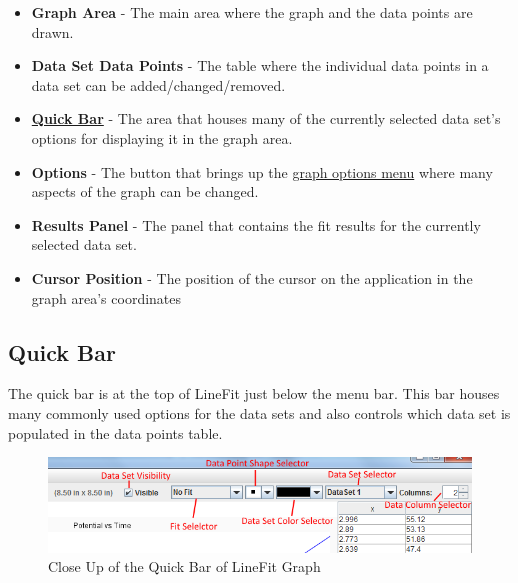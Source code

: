 \documentclass[titlepage,12pt]{article}
\begin{document}
\begin{itemize}
\item \textbf{Graph Area} - The main area where the graph and the data points are drawn.
\item \textbf{Data Set Data Points} - The table where the individual data points in a data set can be added/changed/removed.
\item \hyperref[sec:quickbar]{\textbf{Quick Bar}} - The area that houses many of the currently selected data set's options for displaying it in the graph area.
\item \textbf{Options} - The button that brings up the \hyperref[sec:options]{graph options menu} where many aspects of the graph can be changed.
\item \textbf{Results Panel} - The panel that contains the fit results for the currently selected data set.
\item \textbf{Cursor Position} - The position of the cursor on the application in the graph area's coordinates
\end{itemize}



\subsection{Quick Bar}
\label{sec:quickbar}

The quick bar is at the top of LineFit just below the menu bar. This bar houses many commonly used options for the data sets and also controls which data set is populated in the data points table.

\begin{figure}[ht!]
\centering
\includegraphics[width=15cm]{images/quickBar.png}
\caption{Close Up of the Quick Bar of LineFit Graph}
\end{figure}
\end{document}
